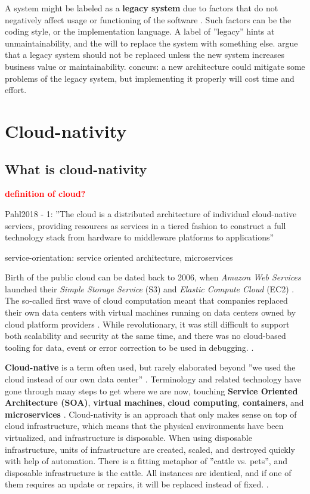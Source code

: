 \documentclass[utf8,english]{gradu3}
\newcommand{\todo}[1]{\textbf{\textcolor{red}{#1}}}
\begin{document}
A system might be labeled as a \textbf{legacy system} due to factors that do not
negatively affect usage or functioning of the software \parencite[22]{Broy2006}.
Such factors can be the coding style, or the implementation language. A label of
''legacy'' hints at unmaintainability, and the will to replace the system with
something else. \textcite[22]{Broy2006} argue that a legacy system should not be
replaced unless the new system increases business value or maintainability.
\textcite[18]{Li2021} concurs: a new architecture could mitigate some problems
of the legacy system, but implementing it properly will cost time and effort.


\section{Cloud-nativity}

\subsection{What is cloud-nativity}

\todo{definition of cloud?}

Pahl2018
- 1: ''The cloud is a distributed architecture of individual cloud-native services,
providing resources as services in a tiered fashion to construct a full
technology stack from hardware to middleware platforms to applications''

service-orientation: service oriented architecture, microservices

Birth of the public cloud can be dated back to 2006, when \textit{Amazon Web
  Services} launched their \textit{Simple Storage Service} (S3) and
\textit{Elastic Compute Cloud} (EC2) \parencite[1]{Kratzke2017}. The so-called
first wave of cloud computation meant that companies replaced their own data
centers with virtual machines running on data centers owned by cloud platform
providers \parencite[17]{Gannon2017}. While revolutionary, it was still
difficult to support both scalability and security at the same time, and there
was no cloud-based tooling for data, event or error correction to be used in
debugging. \parencite[18]{Gannon2017}.

\textbf{Cloud-native} is a term often used, but rarely elaborated beyond ''we
used the cloud instead of our own data center'' \parencite[17]{Gannon2017}.
Terminology and related technology have gone through many steps to get where we
are now, touching \textbf{Service Oriented Architecture (SOA)}, \textbf{virtual
  machines}, \textbf{cloud computing}, \textbf{containers}, and
\textbf{microservices} \parencite[3]{Kratzke2017}. Cloud-nativity is an approach
that only makes sense on top of cloud infrastructure, which means that the
physical environments have been virtualized, and infrastructure is disposable.
When using disposable infrastructure, units of infrastructure are created,
scaled, and destroyed quickly with help of automation. There is a fitting
metaphor of ''cattle vs. pets'', and disposable infrastructure is the cattle.
All instances are identical, and if one of them requires an update or repairs,
it will be replaced instead of fixed. \parencite{Microsoft2022-CNA}.
\end{document}
